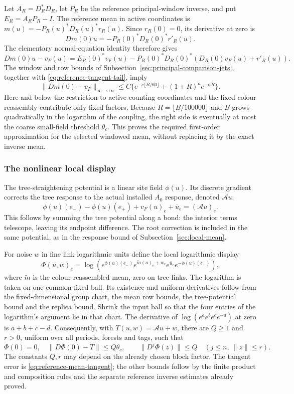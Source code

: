 Let $A_R=D_R^*D_R$, let $P_R$ be the reference principal-window
inverse, and put $E_R=A_RP_R-I$. The reference mean in active
coordinates is $m(u)=-P_R(u)^*D_R(u)^*r_R(u)$. Since
$r_R(0)=0$, its derivative at zero is
\[
 Dm(0)u=-P_R(0)^*D_R(0)^*r'_R(u).
\]
The elementary normal-equation identity therefore gives
\[
 Dm(0)u-v_F(u)
 =E_R(0)^*v_F(u)
       -P_R(0)^*D_R(0)^*(D_R(0)v_F(u)+r'_R(u)).
\]
The window and row bounds of
Subsection~\ref{sec:principal-comparison-jets}, together with
\eqref{eq:reference-tangent-tail}, imply
\begin{equation}\label{eq:reference-mean-tangent}
 \|Dm(0)-v_F\|_{\infty\to\infty}
 \le C\{e^{-c\lfloor B/60\rfloor}
                      +(1+R)^a e^{-\sigma R}\}.
\end{equation}
Here and below the restriction to active counting coordinates
and the fixed colour reassembly contribute only fixed factors.
Because $R=\lfloor B/100000\rfloor$ and $B$ grows quadratically
in the logarithm of the coupling, the right side is eventually
at most the coarse small-field threshold $\theta_c$. This proves
the required first-order approximation for the selected windowed
mean, without replacing it by the exact inverse mean.

\subsubsection{The nonlinear local display}
The tree-straightening potential is a linear site field $\phi(u)$.
Its discrete gradient corrects the tree response to the actual
installed $A_0$ response, denoted $\mathcal A u$:
\[
 \phi(u)(e_-)-\phi(u)(e_+)+v_F(u)_e+\overline u_e
                                             =(\mathcal A u)_e.
\]
This follows by summing the tree potential along a bond: the
interior terms telescope, leaving its endpoint difference. The
root correction is included in the same potential, as in the
response bound of Subsection~\ref{sec:local-mean}.

For noise $w$ in fine link logarithmic units define the local
logarithmic display
\[
 \Phi(u,w)_e=\log\left(
 e^{\phi(u)(e_-)}
 e^{\widetilde m(u)_e+w_e}e^{\overline u_e}
 e^{-\phi(u)(e_+)}\right),
\]
where $\widetilde m$ is the colour-reassembled mean, zero on tree
links. The logarithm is taken on one common fixed ball. Its
existence and uniform derivatives follow from the fixed-dimensional
group chart, the mean row bounds, the tree-potential bound and the
replica bound. Shrink the input ball so that the four entries of
the logarithm's argument lie in that chart. The derivative of
$\log(e^a e^b e^c e^{-d})$ at zero is $a+b+c-d$.
Consequently, with $T(u,w)=\mathcal A u+w$, there are $Q\ge1$
and $r>0$, uniform over all periods, forests and tags, such that
\begin{equation}\label{eq:reference-display-data}
 \Phi(0)=0,\quad \|D\Phi(0)-T\|\le Q\theta_c,
 \qquad \|D^j\Phi(z)\|\le Q\quad
                  (j\le n,\ \|z\|\le r).
\end{equation}
The constants $Q,r$ may depend on the already chosen block factor.
The tangent error is \eqref{eq:reference-mean-tangent}; the
other bounds follow by the finite product and composition rules
and the separate reference inverse estimates already proved.

